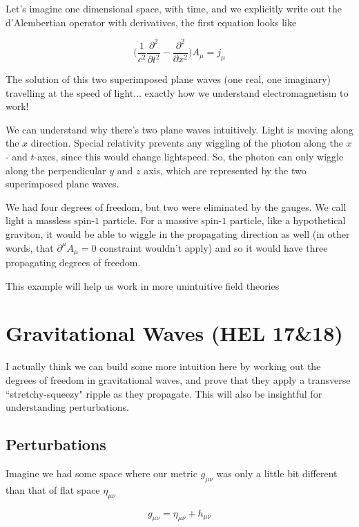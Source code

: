 \documentclass{article}
\newcommand{\mn}{_{\mu\nu}}
\begin{document}
Let's imagine one dimensional space, with time, and we explicitly write out the d'Alembertian operator with derivatives, the first equation looks like

\begin{equation}
    \biggl(\frac{1}{c^2}\frac{\partial^2}{\partial t^2} - \frac{\partial^2}{\partial x^2} \biggr) A_\mu = j_\mu
\end{equation}

The solution of this two superimposed plane waves (one real, one imaginary) travelling at the speed of light... exactly how we understand electromagnetism to work! 

We can understand why there's two plane waves intuitively. Light is moving along the $x$ direction. Special relativity prevents any wiggling of the photon along the $x$- and $t$-axes, since this would change lightspeed. So, the photon can only wiggle along the perpendicular $y$ and $z$ axis, which are represented by the two superimposed plane waves. 

We had four degrees of freedom, but two were eliminated by the gauges. We call light a massless spin-$1$ particle. For a massive spin-$1$ particle, like a hypothetical graviton, it would be able to wiggle in the propagating direction as well (in other words, that $\partial^\mu A_\mu = 0$ constraint wouldn't apply) and so it would have three propagating degrees of freedom.

This example will help us work in more unintuitive field theories

\section{Gravitational Waves (HEL 17\&18)}
I actually think we can build some more intuition here by working out the degrees of freedom in gravitational waves, and prove that they apply a transverse ``stretchy-squeezy" ripple as they propagate. This will also be insightful for understanding perturbations.

\subsection{Perturbations}
Imagine we had some space where our metric $g\mn$ was only a little bit different than that of flat space $\eta\mn$

\begin{equation}
    g\mn = \eta\mn + h\mn
\end{equation}
\end{document}
